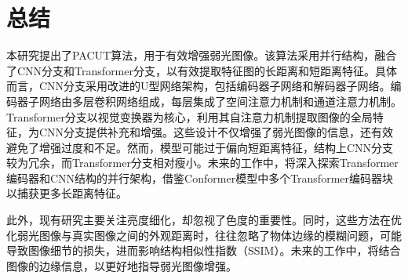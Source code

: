 \documentclass[a4paper]{ctexart}
\begin{document}
\begin{table}[!htbp]
	\centering
	\tiny
	\caption{
		\label{tab: Ablation Study}
		Transformer分支和Transformer预训练权重尺寸和SCConv对模型的影响。
	} 
\end{table}

\section{总结}

本研究提出了PACUT算法，用于有效增强弱光图像。该算法采用并行结构，融合了CNN分支和Transformer分支，以有效提取特征图的长距离和短距离特征。具体而言，CNN分支采用改进的U型网络架构，包括编码器子网络和解码器子网络。编码器子网络由多层卷积网络组成，每层集成了空间注意力机制和通道注意力机制。Transformer分支以视觉变换器为核心，利用其自注意力机制提取图像的全局特征，为CNN分支提供补充和增强。这些设计不仅增强了弱光图像的信息，还有效避免了增强过度和不足。然而，模型可能过于偏向短距离特征，结构上CNN分支较为冗余，而Transformer分支相对瘦小。未来的工作中，将深入探索Transformer编码器和CNN结构的并行架构，借鉴Conformer模型中多个Transformer编码器块以捕获更多长距离特征。

此外，现有研究主要关注亮度细化，却忽视了色度的重要性。同时，这些方法在优化弱光图像与真实图像之间的外观距离时，往往忽略了物体边缘的模糊问题，可能导致图像细节的损失，进而影响结构相似性指数（SSIM）。未来的工作中，将结合图像的边缘信息，以更好地指导弱光图像增强。
\end{document}
